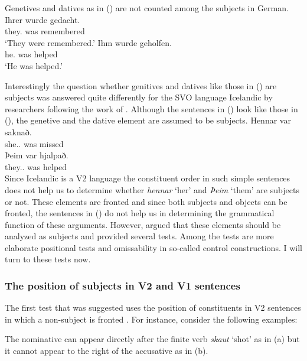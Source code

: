 Genetives and datives as in () are not counted among the subjects in German.
\eal
\ex 
\gll Ihrer wurde gedacht.\\
     they.\GEN{} was remembered\\
\glt `They were remembered.'
\ex 
\gll Ihm wurde geholfen.\\
     he.\DAT{}  was   helped\\
\glt `He was helped.'
\zl

Interestingly the question whether genitives and datives like those in () are subjects was
answered quite differently for the SVO language Icelandic by researchers following the work of
\citet*{ZMT85a}. Although the sentences in () look like those in (), the genetive and
the dative element are assumed to be subjects.
\eal
\label{ex-subject-icelandic-passive-v2}
\ex 
\gll Hennar var saknað.\\
     she.\SG.\GEN{} was missed\\
\ex 
\gll Þeim       var hjalpað.\\
     they.\PL.\DAT{} was helped\\
\zl
Since Icelandic is a V2 language the constituent order in such simple sentences does not help us to
determine whether \emph{hennar} `her' and \emph{Þeim} `them' are subjects or not. These elements are
fronted and since both subjects and objects can be fronted, the sentences in () do not help
us in determining the grammatical function of these arguments. However, \citet*{ZMT85a} argued that
these elements should be analyzed as subjects and provided several tests. Among the tests are more
elaborate positional tests and omissability in so-called control constructions. I will turn to these
tests now.


\subsubsection{The position of subjects in V2 and V1 sentences}


The first test that was suggested uses the position of constituents in V2 sentences in which a
non-subject is fronted \citep*[Section~2.3]{ZMT85a}. For instance, consider the following examples:

\eal
\zl
The nominative can appear directly after the finite verb \emph{skaut} `shot' as in (a) but it
cannot appear to the right of the accusative as in (b).


